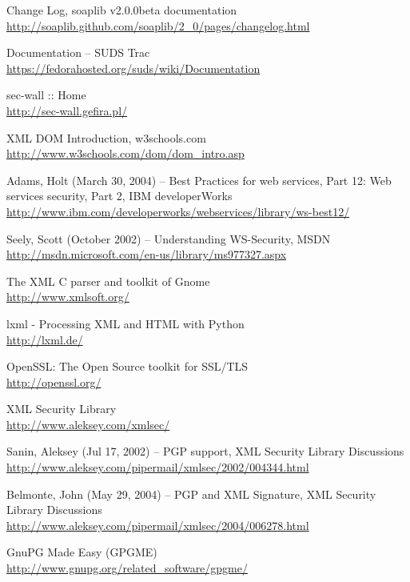 \begin{thebibliography}{99}
Change Log, soaplib v2.0.0beta documentation\\
\url{http://soaplib.github.com/soaplib/2_0/pages/changelog.html}

Documentation -- SUDS Trac\\
\url{https://fedorahosted.org/suds/wiki/Documentation}

sec-wall :: Home\\
\url{http://sec-wall.gefira.pl/}

XML DOM Introduction, w3schools.com\\
\url{http://www.w3schools.com/dom/dom_intro.asp}

Adams, Holt (March 30, 2004) -- Best Practices for web services, Part 12: Web services security, Part 2, IBM developerWorks\\
\url{http://www.ibm.com/developerworks/webservices/library/ws-best12/}

Seely, Scott (October 2002) -- Understanding WS-Security, MSDN\\
\url{http://msdn.microsoft.com/en-us/library/ms977327.aspx}

The XML C parser and toolkit of Gnome\\
\url{http://www.xmlsoft.org/}

lxml - Processing XML and HTML with Python\\
\url{http://lxml.de/}

OpenSSL: The Open Source toolkit for SSL/TLS\\
\url{http://openssl.org/}

XML Security Library\\
\url{http://www.aleksey.com/xmlsec/}

Sanin, Aleksey (Jul 17, 2002) -- PGP support, XML Security Library Discussions\\
\url{http://www.aleksey.com/pipermail/xmlsec/2002/004344.html}

Belmonte, John (May 29, 2004) -- PGP and XML Signature, XML Security Library Discussions\\
\url{http://www.aleksey.com/pipermail/xmlsec/2004/006278.html}

GnuPG Made Easy (GPGME)\\
\url{http://www.gnupg.org/related_software/gpgme/}

\end{thebibliography}
